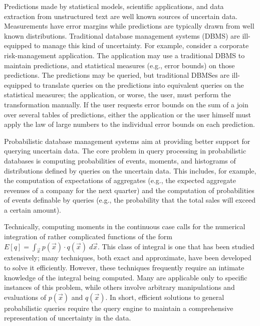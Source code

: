 Predictions made by statistical models, scientific applications, and data extraction from unstructured text are well known sources of uncertain data.  Measurements have error margins while predictions are typically drawn from well known distributions.  Traditional database management systems (DBMS) are ill-equipped to manage this kind of uncertainty.  For example, consider a corporate risk-management application.  The application may use a traditional DBMS to maintain predictions, and statistical measures (e.g., error bounds) on those predictions.  The predictions may be queried, but traditional DBMSes are ill-equipped to translate queries on the predictions into equivalent queries on the statistical measures; the application, or worse, the user, must perform the transformation manually.  If the user requests error bounds on the sum of a join over several tables of predictions, either the application or the user himself must apply the law of large numbers to the individual error bounds on each prediction.

Probabilistic  database  management  systems \cite{dalvi07efficient, WidomTrio2008, KochMayBMS2008, SD2007, ORION, MCDB, BayesStore} aim at providing better support for querying uncertain data.  The core problem in query processing in probabilistic databases is computing probabilities of events, moments, and histograms of distributions defined by queries on the uncertain data.  This includes, for example, the computation of expectations of aggregates (e.g., the expected aggregate revenues of a company for the next quarter) and the computation of probabilities of events definable by queries (e.g., the probability that the total sales will exceed a certain amount).

Technically, computing moments in the continuous case calls for the numerical integration of rather complicated functions of the form $E[q] = \int_{\vec x} p(\vec{x}) \cdot q(\vec{x}) \; d\vec{x}.$
This class of integral is one that has been studied extensively; many techniques, both exact and approximate, have been developed to solve it efficiently.  However, these techniques frequently require an intimate knowledge of the integral being computed.  Many are applicable only to specific instances of this problem, while others involve arbitrary manipulations and evaluations of $p(\vec x)$ and $q(\vec x)$.  In short, efficient solutions to general probabilistic queries require the query engine to maintain a comprehensive representation of uncertainty in the data.

